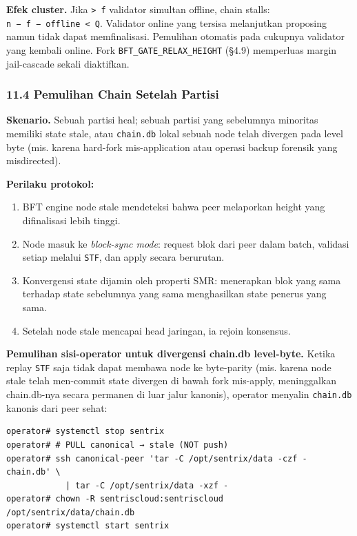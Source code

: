 \documentclass[11pt,a4paper]{article}
\providecommand{\tightlist}{\setlength{\itemsep}{0pt}\setlength{\parskip}{0pt}}
\begin{document}
\textbf{Efek cluster.} Jika \texttt{\textgreater{}\ f} validator simultan offline, chain stalls: \texttt{n\ −\ f\ −\ offline\ \textless{}\ Q}. Validator online yang tersisa melanjutkan proposing namun tidak dapat memfinalisasi. Pemulihan otomatis pada cukupnya validator yang kembali online. Fork \texttt{BFT\_GATE\_RELAX\_HEIGHT} (§4.9) memperluas margin jail-cascade sekali diaktifkan.

\hypertarget{pemulihan-chain-setelah-partisi}{%
\subsubsection{11.4 Pemulihan Chain Setelah Partisi}\label{pemulihan-chain-setelah-partisi}}

\textbf{Skenario.} Sebuah partisi heal; sebuah partisi yang sebelumnya minoritas memiliki state stale, atau \texttt{chain.db} lokal sebuah node telah divergen pada level byte (mis. karena hard-fork mis-application atau operasi backup forensik yang misdirected).

\textbf{Perilaku protokol:}

\begin{enumerate}
\def\labelenumi{\arabic{enumi}.}
\tightlist
\item
  BFT engine node stale mendeteksi bahwa peer melaporkan height yang difinalisasi lebih tinggi.
\item
  Node masuk ke \emph{block-sync mode}: request blok dari peer dalam batch, validasi setiap melalui \texttt{STF}, dan apply secara berurutan.
\item
  Konvergensi state dijamin oleh properti SMR: menerapkan blok yang sama terhadap state sebelumnya yang sama menghasilkan state penerus yang sama.
\item
  Setelah node stale mencapai head jaringan, ia rejoin konsensus.
\end{enumerate}

\textbf{Pemulihan sisi-operator untuk divergensi chain.db level-byte.} Ketika replay \texttt{STF} saja tidak dapat membawa node ke byte-parity (mis. karena node stale telah men-commit state divergen di bawah fork mis-apply, meninggalkan chain.db-nya secara permanen di luar jalur kanonis), operator menyalin \texttt{chain.db} kanonis dari peer sehat:

\begin{verbatim}
operator# systemctl stop sentrix
operator# # PULL canonical → stale (NOT push)
operator# ssh canonical-peer 'tar -C /opt/sentrix/data -czf - chain.db' \
            | tar -C /opt/sentrix/data -xzf -
operator# chown -R sentriscloud:sentriscloud /opt/sentrix/data/chain.db
operator# systemctl start sentrix
\end{verbatim}
\end{document}
